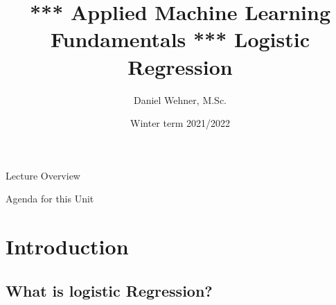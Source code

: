 


\title[Logistic Regression]{*** Applied Machine Learning Fundamentals *** Logistic Regression}
\author{Daniel Wehner, M.Sc.}
\date{Winter term 2021/2022}




\maketitlepage


\begin{frame}{Lecture Overview}{}
\end{frame}


\begin{frame}{Agenda for this Unit}
	\begin{multicols}{2}
		\tableofcontents
	\end{multicols}
\end{frame}


\section{Introduction}

\subsection{What is logistic Regression?}


